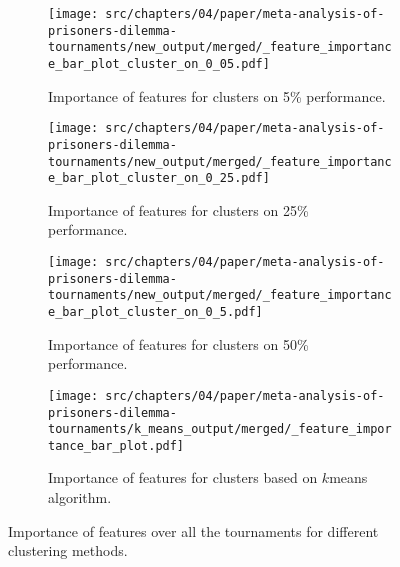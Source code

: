\begin{figure}[!htbp]
    \begin{subfigure}[t]{0.5\textwidth}
        \begin{center}
            \texttt{[image: src/chapters/04/paper/meta-analysis-of-prisoners-dilemma-tournaments/new\_output/merged/\_feature\_importance\_bar\_plot\_cluster\_on\_0\_05.pdf]}
        \end{center}
        \caption{Importance of features for clusters on 5\% performance.}
    \end{subfigure}
    \begin{subfigure}[t]{0.5\textwidth}
        \begin{center}
            \texttt{[image: src/chapters/04/paper/meta-analysis-of-prisoners-dilemma-tournaments/new\_output/merged/\_feature\_importance\_bar\_plot\_cluster\_on\_0\_25.pdf]}
        \end{center}
        \caption{Importance of features for clusters on 25\% performance.}
    \end{subfigure}
    \begin{subfigure}[t]{0.5\textwidth}
        \begin{center}
            \texttt{[image: src/chapters/04/paper/meta-analysis-of-prisoners-dilemma-tournaments/new\_output/merged/\_feature\_importance\_bar\_plot\_cluster\_on\_0\_5.pdf]}
        \end{center}
        \caption{Importance of features for clusters on 50\% performance.}
    \end{subfigure}
    \begin{subfigure}[t]{0.5\textwidth}
        \begin{center}
            \texttt{[image: src/chapters/04/paper/meta-analysis-of-prisoners-dilemma-tournaments/k\_means\_output/merged/\_feature\_importance\_bar\_plot.pdf]}
        \end{center}
        \caption{Importance of features for clusters based on \(k\)means algorithm.}
    \end{subfigure}
    \caption{Importance of features over all the tournaments for different
    clustering methods.}\label{fig:clustering_importance_overall}
\end{figure}

